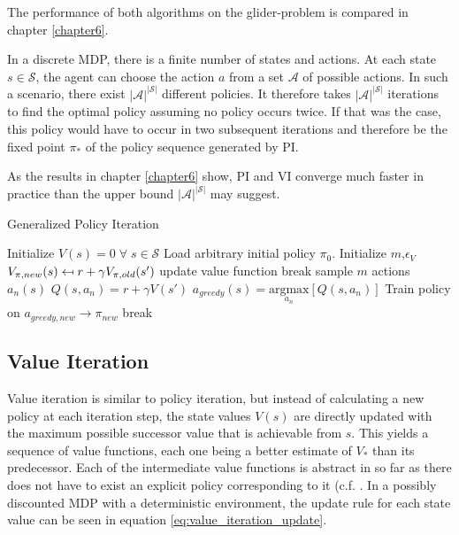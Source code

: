 The performance of both algorithms on the glider-problem is compared in chapter \ref{chapter6}. \bigbreak

In a discrete MDP, there is a finite number of states and actions. At each state $s \in \mathcal{S}$, the agent can choose the action $a$ from a set $\mathcal{A}$ of possible actions. In such a scenario, there exist $|\mathcal{A}|^{|\mathcal{S}|}$ different policies. It therefore takes $|\mathcal{A}|^{|\mathcal{S}|}$ iterations to find the optimal policy assuming no policy occurs twice. If that was the case, this policy would have to occur in two subsequent iterations and therefore be the fixed point $\pi_*$ of the policy sequence generated by PI.

As the results in chapter \ref{chapter6} show, PI and VI converge much faster in practice than the upper bound $|\mathcal{A}|^{|\mathcal{S}|}$ may suggest.

\begin{algorithm}
	\caption{Generalized Policy Iteration}
	\begin{algorithmic}[0] %
			\State
			\State Initialize $V(s) = 0 \; \forall \; s \in \mathcal{S}$
			\State Load arbitrary initial policy $\pi_0$.
			\State Initialize $m$,$\epsilon_V$
					\State $V_{\pi,new}(s) \mathrel{\reflectbox{\ensuremath{\mapsto}}} r+\gamma V_ {\pi,old}(s')$
				\EndFor
				\State update value function
					\State break
				\EndIf
				\EndWhile
			\EndFunction
			\State
					\State sample $m$ actions $a_n(s)$
						\State $Q(s,a_n) = r + \gamma V(s')$
					\EndFor
					\State $a_{greedy}(s)=\underset{a_n}{\text{argmax}}[Q(s,a_n)]$
				\EndFor
			\EndFunction
			\State
			\State Train policy on $a_{greedy,new} \rightarrow \pi_{new}$
				\State break
			\EndIf

			\EndWhile
			\State
		\EndFunction
	\end{algorithmic}
	\label{algo:gpi}
\end{algorithm}

\subsection{Value Iteration}
\label{subsection:VI}
Value iteration is similar to policy iteration, but instead of calculating a new policy at each iteration step, the state values $V(s)$ are directly updated with the maximum possible successor value that is achievable from $s$. This yields a sequence of value functions, each one being a better estimate of $V_*$ than its predecessor. Each of the intermediate value functions is abstract in so far as there does not have to exist an explicit policy corresponding to it (c.f. \cite[lecture~3]{Silver2015}. In a possibly discounted MDP with a deterministic environment, the update rule for each state value can be seen in equation \ref{eq:value_iteration_update}.

